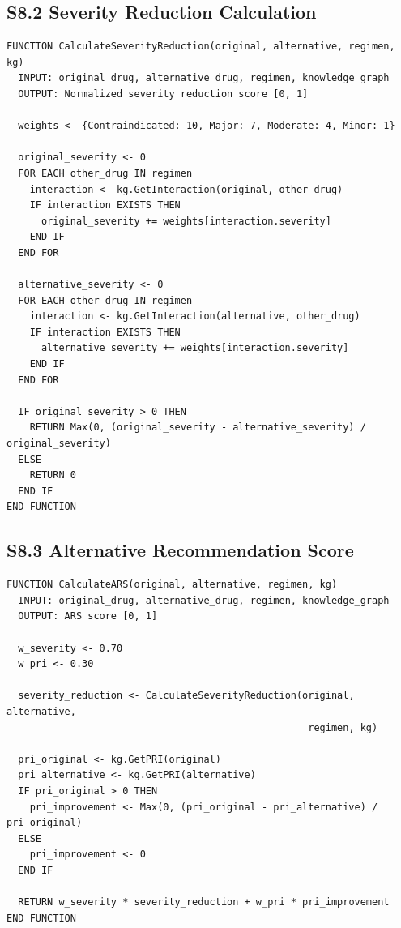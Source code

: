 \documentclass[12pt,a4paper]{article}
\begin{document}
\subsection{S8.2 Severity Reduction Calculation}

\begin{verbatim}
FUNCTION CalculateSeverityReduction(original, alternative, regimen, kg)
  INPUT: original_drug, alternative_drug, regimen, knowledge_graph
  OUTPUT: Normalized severity reduction score [0, 1]
  
  weights <- {Contraindicated: 10, Major: 7, Moderate: 4, Minor: 1}
  
  original_severity <- 0
  FOR EACH other_drug IN regimen
    interaction <- kg.GetInteraction(original, other_drug)
    IF interaction EXISTS THEN
      original_severity += weights[interaction.severity]
    END IF
  END FOR
  
  alternative_severity <- 0
  FOR EACH other_drug IN regimen
    interaction <- kg.GetInteraction(alternative, other_drug)
    IF interaction EXISTS THEN
      alternative_severity += weights[interaction.severity]
    END IF
  END FOR
  
  IF original_severity > 0 THEN
    RETURN Max(0, (original_severity - alternative_severity) / original_severity)
  ELSE
    RETURN 0
  END IF
END FUNCTION
\end{verbatim}

\subsection{S8.3 Alternative Recommendation Score}

\begin{verbatim}
FUNCTION CalculateARS(original, alternative, regimen, kg)
  INPUT: original_drug, alternative_drug, regimen, knowledge_graph
  OUTPUT: ARS score [0, 1]
  
  w_severity <- 0.70
  w_pri <- 0.30
  
  severity_reduction <- CalculateSeverityReduction(original, alternative, 
                                                    regimen, kg)
  
  pri_original <- kg.GetPRI(original)
  pri_alternative <- kg.GetPRI(alternative)
  IF pri_original > 0 THEN
    pri_improvement <- Max(0, (pri_original - pri_alternative) / pri_original)
  ELSE
    pri_improvement <- 0
  END IF
  
  RETURN w_severity * severity_reduction + w_pri * pri_improvement
END FUNCTION
\end{verbatim}
\end{document}
